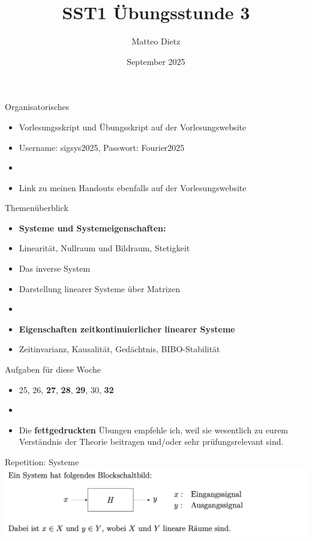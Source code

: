 \documentclass[14pt, aspectratio=169, handout]{beamer}
\title{SST1 Übungsstunde 3}
\author{Matteo Dietz}
\date{September 2025}
\begin{document}
\maketitle

\begin{frame}{Organisatorisches}
    \begin{itemize}
        \item Vorlesungsskript und Übungsskript auf der Vorlesungswebsite
        \item[] Username: sigsys2025, \hspace{10pt} Passwort: Fourier2025
        \item[] 
        \item Link zu meinen Handouts ebenfalls auf der Vorlesungswebsite
    \end{itemize}
\end{frame}

\begin{frame}{Themenüberblick}
    \begin{itemize}
        \item \textbf{Systeme und Systemeigenschaften:}
        \item[] Linearität, Nullraum und Bildraum, Stetigkeit
        \item[] Das inverse System
        \item[] Darstellung linearer Systeme über Matrizen
        \item[] 
        \item \textbf{Eigenschaften zeitkontinuierlicher linearer Systeme}
        \item[] Zeitinvarianz, Kausalität, Gedächtnis, BIBO-Stabilität
    \end{itemize}
\end{frame}

\begin{frame}{Aufgaben für diese Woche}
    \begin{itemize}
        \item[] 25, 26, \textbf{27}, \textbf{28}, \textbf{29}, 30, \textbf{32}
        \item[] 
        \item[] Die \textbf{fettgedruckten} Übungen empfehle ich, weil sie wesentlich zu eurem Verständnis der Theorie beitragen und/oder sehr prüfungsrelevant sind.
    \end{itemize}
\end{frame}

\begin{frame}{Repetition: Systeme}
    \includegraphics[width=1.1\linewidth]{figures/System_Blockschaltbild.png}
\end{frame}
\end{document}
